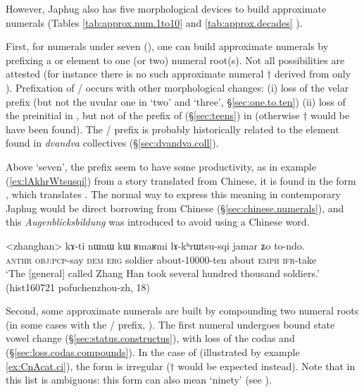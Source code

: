 However, Japhug also has five morphological devices to build approximate numerals (Tables \ref{tab:approx.num.1to10} and \ref{tab:approx.decades} ).

First, for numerals under seven (), one can build approximate numerals by prefixing a  or  element to one (or two) numeral root(s). Not all possibilities are attested (for instance there is no such approximate numeral $\dagger$ derived from only ).  Prefixation of  /  occurs with other morphological changes: (i) loss of the velar  prefix (but not the uvular one in `two' and `three', §\ref{sec:one.to.ten}) (ii) loss of the  preinitial in  , but not of the  prefix of  (§\ref{sec:teens}) in  (otherwise $\dagger$ would be have been found). The  /  prefix is probably historically related to the  element found in \textit{dvandva} collectives (§\ref{sec:dvandva.coll}).  


Above `seven', the  prefix seem to have some productivity, as in example (\ref{ex:lAkhrWtsusqi}) from a story translated from Chinese, it is found in the form , which translates . The normal way to express this meaning in contemporary Japhug would be direct borrowing from Chinese (§\ref{sec:chinese.numerals}), and this \textit{Augenblicksbildung} was introduced to avoid using a Chinese word.

\begin{exe}
\ex \label{ex:lAkhrWtsusqi} 
\gll <zhanghan> kɤ-ti nɯnɯ kɯ ʁmaʁmi lɤ-kʰrɯtsu-sqi jamar ʑo to-ndo. \\
\textsc{anthr} \textsc{obj}:\textsc{pcp}-say \textsc{dem} \textsc{erg} soldier about-10000-ten about \textsc{emph} \textsc{ifr}-take \\
\glt `The [general] called Zhang Han took several hundred thousand soldiers.' (hist160721 pofuchenzhou-zh, 18)
\end{exe}

Second, some approximate numerals are built by compounding two numeral roots (in some cases with the   /  prefix, ). The first numeral undergoes bound state vowel change (§\ref{sec:status.constructus}), with loss of the codas  and  (§\ref{sec:loss.codas.compounds}). In the case of  (illustrated by example \ref{ex:CnAcat.ci}), the form  is irregular ($\dagger$ would be expected instead). Note that in this list  is ambiguous: this form can also mean `ninety' (see ).

